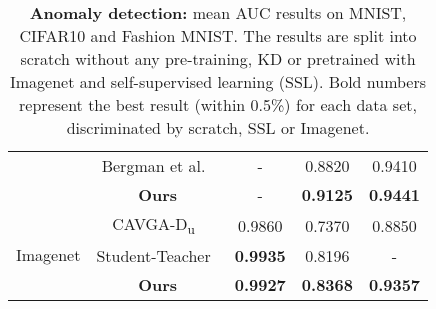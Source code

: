 \documentclass[final]{cvpr}
\begin{document}
\begin{table}[t!]
{\begin{tabular}{@{}c|c|ccc@{}}
 &Bergman et al.~\cite{bergman2020classification}	        &	-        &	0.8820	  &  0.9410     \\	
&\textbf{Ours}	            &	-	& 	\textbf{0.9125}	 & \textbf{0.9441} \\\hline
\multirow{3}{*}{Imagenet} &CAVGA-D\textsubscript{u}~\cite{venkataramanan2019attention} 	&	0.9860        &	0.7370	    &  0.8850      \\	
&Student-Teacher~\cite{bergmann2020uninformed}	        &	\textbf{0.9935}	        &	0.8196	  &  -      \\	
&\textbf{Ours}	            &	\textbf{0.9927}	&	\textbf{0.8368}	 & \textbf{0.9357} \\ 

\bottomrule
\end{tabular}}
\caption{\textbf{Anomaly detection:} mean AUC results on MNIST, CIFAR10 and Fashion MNIST. The results are split into scratch without any pre-training, KD or pretrained with Imagenet and self-supervised learning (SSL). Bold numbers represent the best result (within 0.5\%) for each data set, discriminated by scratch, SSL or Imagenet.}
\label{tab:auc_detection}
\end{table}
\end{document}
